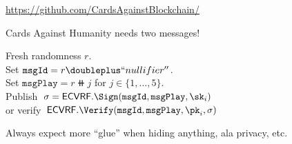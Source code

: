 \documentclass{beamer}
\begin{document}
\begin{frame}
\begin{columns}
\begin{column}[t]{0.3\textwidth}
    \end{column}
\end{columns}

\bigskip\bigskip

\url{https://github.com/CardsAgainstBlockchain/}

\end{frame}


\begin{frame}

Cards Against Humanity needs two messages!

\bigskip

Fresh randomness $r$. \\
Set $\mathtt{msgId} = r \doubleplus ``nullifier''$. \\
Set $\mathtt{msgPlay} = r \doubleplus j$ for $j \in \{1,\ldots,5\}$. \\
Publish $\sigma = \mathsf{ECVRF}.\Sign(\mathtt{msgId},\mathtt{msgPlay},\sk_i)$ \\
or verify $\mathsf{ECVRF}.\Verify(\mathtt{msgId},\mathtt{msgPlay},\pk_i,\sigma)$ \\

\bigskip\bigskip

Always expect more ``glue'' when hiding anything, ala privacy, etc.

\end{frame}
\end{document}
